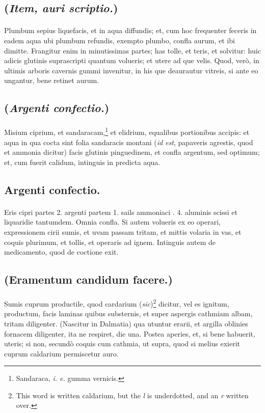 \documentclass[a4paper, 11pt, oneside, polutonikogreek, italian]{article}
\begin{document}
\subsection{(\emph{Item, auri scriptio.})}
\paragraph{}
Plumbum sepius liquefacis, et in aqua diffundis; et, cum hoc frequenter feceris in eadem aqua ubi plumbum refundis, exempto plumbo, confla aurum, et ibi dimitte. Frangitur enim in minutissimas partes; has tolle, et teris, et solvitur: huic adicis glutinis suprascripti quantum volueris; et utere ad que velis. Quod, verò, in ultimis arboris cavernis gummi invenitur, in his que deaurautur vitreis, si ante eo ungantur, bene retinet aurum.

\subsection{(\emph{Argenti confectio.})}
\paragraph{}
Misium ciprium, et sandaracam,\footnote{Sandaraca, \emph{i. e.} gumma vernicis.} et elidrium, equalibus portionibus accipis: et aqua in qua cocta sint folia sandaracis montani (\emph{id est}, papaveris agrestis, quod et ammonia dicitur) facis glutinis pinguedinem, et confla argentum, sed optimum; et, cum fuerit calidum, intinguis in predicta aqua.

\subsection{Argenti confectio.}
\paragraph{}
Eris cipri partes 2. argenti partem 1. sails ammoniaci \roundz. 4. aluminis scissi et liquaridie tantumdem. Omnia confla. Si autem volueris ex eo operari, expressionem cirii sumis, et uvam passam tritam, et mittis volaria in vas, et coquis plurimum, et tollis, et operaris ad ignem. Intinguis autem de medicamento, quod de coctione exit.

\subsection{(Eramentum candidum facere.)}
\paragraph{}
Sumis cuprum productile, quod cardarium (\emph{sic})\footnote{This word is written caldarium, but the \emph{l} is underdotted, and an \emph{r} written over.} dicitur, vel es ignitum, productum, facis laminas quibus substernis, et super aspergis cathmiam albam, tritam diligenter. (Nascitur in Dalmatia) qua utuntur erarii, et argilla oblinies fornacem diligenter, ita ne respiret, die una. Postea aperies, et, si bene habuerit, uteris; si non, secundò coquis cum cathmia, ut supra, quod si melius exierit cuprum caldarium permiscetur auro.
\end{document}
